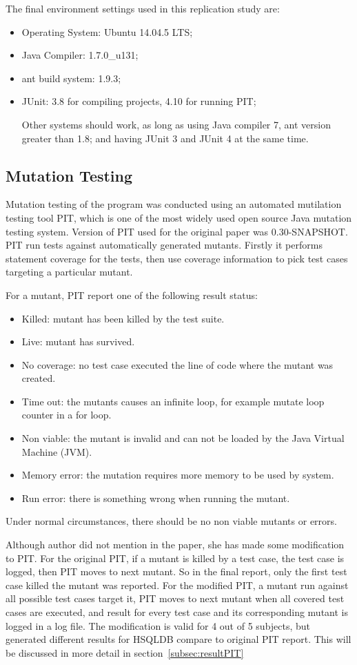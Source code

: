 The final environment settings used in this replication study are:
\begin{itemize}
	\item Operating System: Ubuntu 14.04.5 LTS;
	\item Java Compiler: 1.7.0\_u131;
	\item ant build system: 1.9.3;
	\item JUnit: 3.8 for compiling projects, 4.10 for running PIT;
	
Other systems should work, as long as using Java compiler 7, ant version greater than 1.8; and having JUnit 3 and JUnit 4  at the same time.
\end{itemize}


\subsection{Mutation Testing}
Mutation testing of the program was conducted using an automated mutilation testing tool PIT, which is one of the most widely used open source Java mutation testing system. Version of PIT used for the original paper was 0.30-SNAPSHOT. PIT run tests against automatically generated mutants. Firstly it performs statement coverage for the tests, then use coverage information to pick test cases targeting a particular mutant.

For a mutant, PIT report one of the following result status:
\begin{itemize}
	\item Killed: mutant has been killed by the test suite.
	\item Live: mutant has survived.
	\item No coverage: no test case executed the line of code where the mutant was created.
	\item Time out: the mutants causes an infinite loop, for example mutate loop counter in a for loop.
	\item Non viable: the mutant is invalid and can not be loaded by the Java Virtual Machine (JVM).
	\item Memory error: the mutation requires more memory to be used by system.
	\item Run error: there is something wrong when running the mutant.	
\end{itemize}

Under normal circumstances, there should be no non viable mutants or errors.

Although author did not mention in the paper, she has made some modification to PIT. For the original PIT, if a mutant is killed by a test case, the test case is logged, then PIT moves to next mutant. So in the final report, only the first test case killed the mutant was reported. For the modified  PIT, a mutant run against all possible test cases target it, PIT moves to next mutant when all covered test cases are executed, and result for every test case and its corresponding mutant is logged in a log file. The modification is valid for 4 out of 5 subjects, but generated different results for HSQLDB compare to original PIT report. This will be discussed in more detail in section~\ref{subsec:resultPIT}

